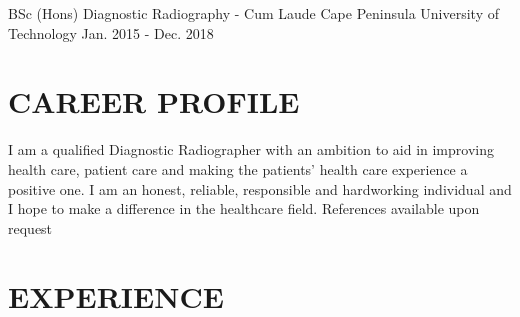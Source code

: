\documentclass[9pt]{orbit-cv}
\begin{document}






\addEducation
  {BSc (Hons) Diagnostic Radiography - Cum Laude}
  {Cape Peninsula University of Technology}
  {Jan. 2015 - Dec. 2018}



\makeprofile

\section{\faUser{} CAREER PROFILE}
  I am a qualified Diagnostic Radiographer with an ambition to aid in improving health care, patient care and making the patients’ health care experience a positive one.
  I am an honest, reliable, responsible and hardworking individual and I hope to make a difference in the healthcare field.
  References available upon request

\section{\faBriefcase{} EXPERIENCE}
\end{document}
